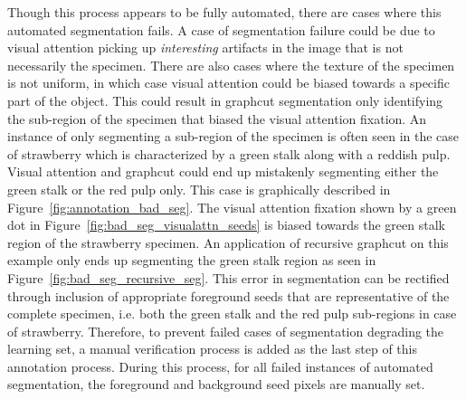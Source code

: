\documentclass {udthesis}
\begin{document}
Though this process appears to be fully automated, there are cases where this automated segmentation fails. A case of segmentation failure could be due to visual attention picking up \emph{interesting} artifacts in the image that is not necessarily the specimen. There are also cases where the texture of the specimen is not uniform, in which case visual attention could be biased towards a specific part of the object. This could result in graphcut segmentation only identifying the sub-region of the specimen that biased the visual attention fixation. An instance of only segmenting a sub-region of the specimen is often seen in the case of strawberry which is characterized by a green stalk along with a reddish pulp. Visual attention and graphcut could end up mistakenly segmenting either the green stalk or the red pulp only. This case is graphically 
described in Figure~\ref{fig:annotation_bad_seg}. The visual attention fixation shown by a green dot in Figure~\ref{fig:bad_seg_visualattn_seeds} is biased towards the green stalk region of the strawberry specimen. An application of recursive graphcut on this example only ends up segmenting the green stalk region as seen in Figure~\ref{fig:bad_seg_recursive_seg}. This error in segmentation can be rectified through inclusion of appropriate foreground seeds that are representative of the complete specimen, i.e. both the green stalk and the red pulp sub-regions in case of strawberry. Therefore, to prevent failed cases of segmentation degrading the learning set, a manual verification process is added as the last step of this annotation process. During this process, for all failed instances of automated segmentation, the foreground and background seed pixels are manually set. 
%
\end{document}
